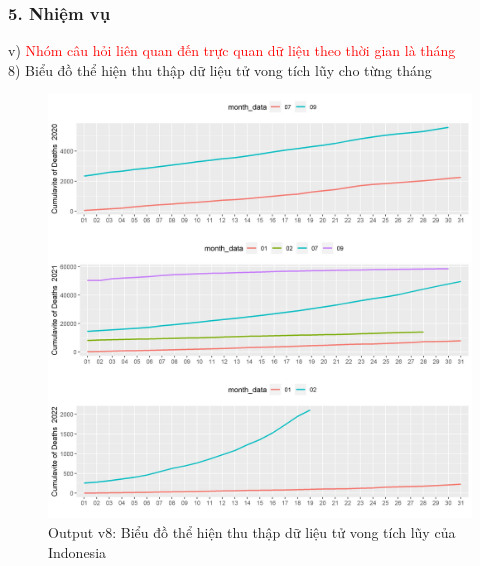 \documentclass[english,10pt,table]{beamer}
\begin{document}
\begin{frame}[fragile]
\frametitle{5.  Nhiệm vụ}
v) \textcolor{red}{Nhóm câu hỏi liên quan đến trực quan dữ liệu theo thời gian là tháng}\\
    8) Biểu đồ thể hiện thu thập dữ liệu tử vong tích lũy cho từng tháng
	\begin{figure}[h!]
	\begin{center}
		    \includegraphics[scale = 0.26]{Images/V/v8 Indonesia .jpeg}
		     \caption{Output v8: Biểu đồ thể hiện thu thập dữ liệu tử vong tích lũy của Indonesia}
		\end{center}
		\end{figure}
\end{frame}
\end{document}
